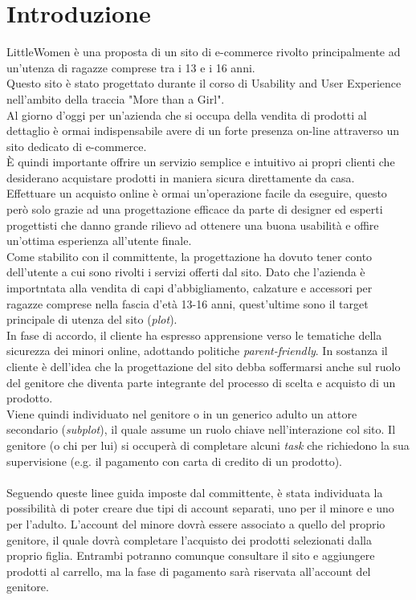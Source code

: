 \documentclass[12pt,a4paper]{report}
\begin{document}
\chapter{Introduzione}
LittleWomen è una proposta di un sito di e-commerce rivolto principalmente ad un'utenza di ragazze comprese tra i 13 e i 16 anni.\\Questo sito è stato progettato durante il corso di Usability and User Experience nell'ambito della traccia "More than a Girl".
\vspace{10mm}\\ Al giorno d'oggi per un'azienda che si occupa della vendita di prodotti al dettaglio è ormai indispensabile avere di un forte presenza on-line attraverso un sito dedicato di e-commerce.\\
È quindi importante offrire un servizio semplice e intuitivo ai propri clienti che desiderano acquistare prodotti in maniera sicura direttamente da casa.\\
Effettuare un acquisto online è ormai un'operazione facile da eseguire, questo però solo grazie ad una progettazione efficace da parte di designer ed esperti progettisti che danno grande rilievo ad ottenere una buona usabilità e offire un'ottima esperienza all'utente finale.
\vspace{10mm}\\Come stabilito con il committente, la progettazione ha dovuto tener conto dell'utente a cui sono rivolti i servizi offerti dal sito. Dato che l'azienda è importntata alla vendita di capi d'abbigliamento, calzature e accessori per ragazze comprese nella fascia d'età 13-16 anni, quest'ultime sono il target principale di utenza del sito (\textit{plot}).\\
In fase di accordo, il cliente ha espresso apprensione verso le tematiche della sicurezza dei minori online, adottando politiche \textit{parent-friendly}. In sostanza il cliente è dell'idea che la progettazione del sito debba soffermarsi anche sul ruolo del genitore che diventa parte integrante del processo di scelta e acquisto di un prodotto.
\vspace{10mm}\\Viene quindi individuato nel genitore o in un generico adulto un attore secondario (\textit{subplot}), il quale assume un ruolo chiave nell'interazione col sito.
Il genitore (o chi per lui) si occuperà di completare alcuni \textit{task} che richiedono la sua supervisione (e.g. il pagamento con carta di credito di un prodotto).\\
\vspace{10mm}\\Seguendo queste linee guida imposte dal committente, è stata individuata la possibilità di poter creare due tipi di account separati, uno per il minore e uno per l'adulto. L'account del minore dovrà essere associato a quello del proprio genitore, il quale dovrà completare l'acquisto dei prodotti selezionati dalla proprio figlia. Entrambi potranno comunque consultare il sito e aggiungere prodotti al carrello, ma la fase di pagamento sarà riservata all'account del genitore.
\end{document}
